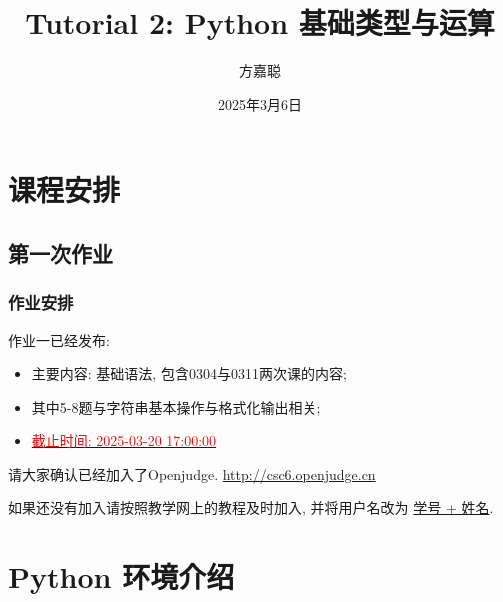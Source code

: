 \documentclass[handout]{ctexbeamer}
\title{Tutorial 2: Python 基础类型与运算}
\author{方嘉聪}
\institute{jiacong\_fang@stu.pku.edu.cn}
\date{2025年3月6日}
\begin{document}
    \begin{frame}
        \titlepage
    \end{frame}

    \section{课程安排}
    \subsection{第一次作业}
    \begin{frame}[fragile]  
        \frametitle{作业安排}     
        作业一已经发布: 
        \begin{itemize}
            \item 主要内容: 基础语法, 包含0304与0311两次课的内容;
            \item 其中5-8题与字符串基本操作与格式化输出相关;
            \item \underline{\textcolor{red}{截止时间: 2025-03-20 17:00:00}}
        \end{itemize}
        \vspace{2em}
        请大家确认已经加入了Openjudge. \href{http://csc6.openjudge.cn}{http://csc6.openjudge.cn}
        \vspace{1em}
        
        如果还没有加入请按照教学网上的教程及时加入, 并将用户名改为 \underline{学号 + 姓名}.
    \end{frame}

    \section{Python 环境介绍}
\end{document}
